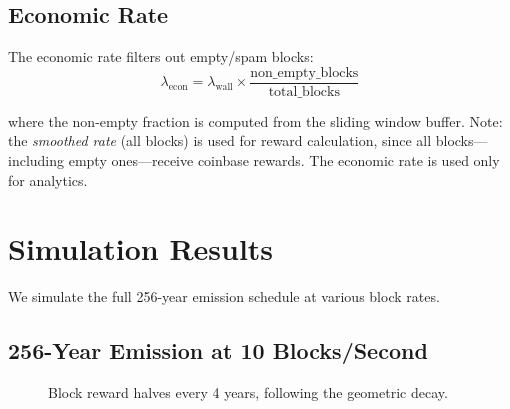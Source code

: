 \documentclass[11pt,a4paper]{article}
\begin{document}
\subsection{Economic Rate}

The economic rate filters out empty/spam blocks:
\begin{equation}
    \lambda_{\text{econ}} = \lambda_{\text{wall}} \times \frac{\text{non\_empty\_blocks}}{\text{total\_blocks}}
\end{equation}

where the non-empty fraction is computed from the sliding window buffer. Note: the \emph{smoothed rate} (all blocks) is used for reward calculation, since all blocks---including empty ones---receive coinbase rewards. The economic rate is used only for analytics.

\section{Simulation Results}
\label{sec:simulation}

We simulate the full 256-year emission schedule at various block rates.

\subsection{256-Year Emission at 10 Blocks/Second}

\begin{figure}[H]
\centering
{}
\caption{Block reward halves every 4 years, following the geometric decay.}
\end{figure}
\end{document}
